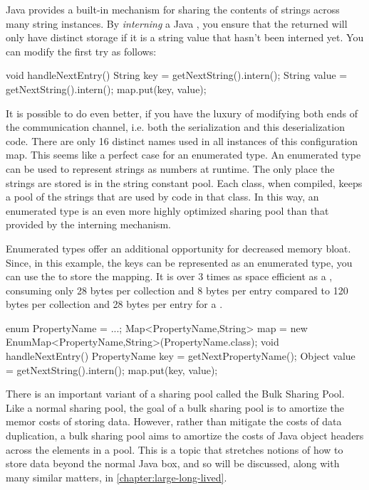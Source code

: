 Java provides a built-in mechanism for sharing the contents of strings across
many string instances. By \emph{interning} a Java
, you ensure that the returned  will only have
distinct storage if it is a string value that hasn't been interned yet. You can
modify the first try as follows:

\begin{shortlisting}
void handleNextEntry() {
   String key = getNextString().intern();
   String value = getNextString().intern();
   map.put(key, value);
}
\end{shortlisting} 

It is possible to do even better, if you have the luxury of modifying both ends
of the communication channel, i.e. both the serialization and this
deserialization code. There are only 16 distinct names used in all instances of
this configuration map. This seems like a perfect case for an enumerated type. An
enumerated type can be used to represent strings as numbers at runtime. The only
place the strings are stored is in the string constant pool. Each class, when compiled, keeps a pool of the strings that are used by
code in that class. In this way, an enumerated type is an even more highly
optimized sharing pool than that provided by the interning mechanism. 

Enumerated types offer an additional opportunity for decreased memory bloat.
Since, in this example, the keys can be represented as an enumerated type, you
can use the  to store the mapping. It is over 3 times as space
efficient as a , consuming only 28 bytes per collection and 8
bytes per entry compared to 120 bytes per collection and 28 bytes per entry for a
.

\begin{shortlisting}
enum PropertyName = {...};
Map<PropertyName,String> map = new EnumMap<PropertyName,String>(PropertyName.class);
void handleNextEntry() {
   PropertyName key = getNextPropertyName();
   Object value = getNextString().intern();
   map.put(key, value);
}
\end{shortlisting} 

There is an important variant of a sharing pool called the Bulk Sharing Pool.
Like a normal sharing pool, the goal of a bulk sharing pool is to amortize the
memor costs of storing data. However, rather than mitigate the costs of data
duplication, a bulk sharing pool aims to amortize the costs of Java object
headers across the elements in a pool. This is a topic that stretches notions of
how to store data beyond the normal Java box, and so will be discussed, along
with many similar matters, in \autoref{chapter:large-long-lived}.


